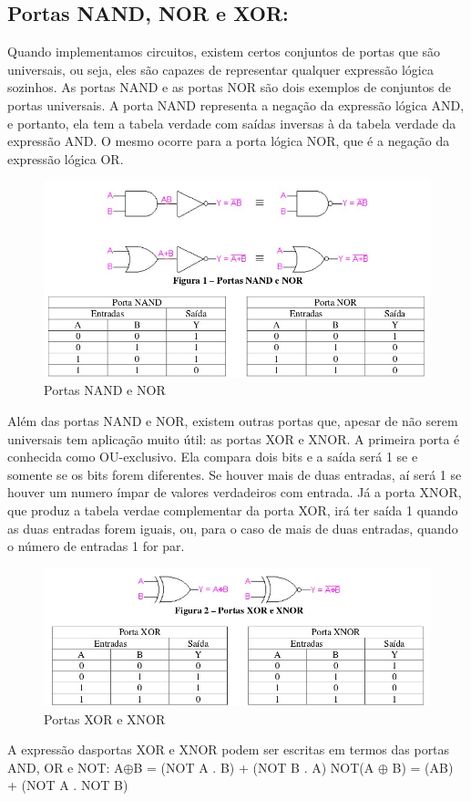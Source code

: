 \documentclass[12pt]{article}
\begin{document}
	
	\subsection{Portas NAND, NOR e XOR:}
	
	Quando implementamos circuitos, existem certos conjuntos de portas que são universais, ou seja, eles são capazes de representar qualquer expressão lógica sozinhos. As portas NAND e as portas NOR são dois exemplos de conjuntos de portas universais. A porta NAND representa a negação da expressão lógica AND, e portanto, ela tem a tabela verdade com saídas inversas à da tabela verdade da expressão AND. O mesmo ocorre para a porta lógica NOR, que é a negação da expressão lógica OR.
	
	\begin{figure}[H]
		\centering
		\includegraphics[width=.5\textwidth]{nandnor.jpg}
		\caption{Portas NAND e NOR}
		\label{fig:exemplo}
	\end{figure}
	
	
	Além das portas NAND e NOR, existem outras portas que, apesar de não serem universais tem aplicação muito útil: as portas XOR e XNOR. A primeira porta é conhecida como OU-exclusivo. Ela compara dois bits e a saída será 1 se e somente se os bits forem diferentes. Se houver mais de duas entradas, aí será 1 se houver um numero ímpar de valores verdadeiros com entrada. Já a porta XNOR, que produz a tabela verdae complementar da porta XOR, irá ter saída 1 quando as duas entradas forem iguais, ou, para o caso de mais de duas entradas, quando o número de entradas 1 for par. 
	
	\begin{figure}[H]
		\centering
		\includegraphics[width=.5\textwidth]{xorxnor.jpg}
		\caption{Portas XOR e XNOR}
		\label{fig:exemplo}
	\end{figure}
	
	A expressão dasportas XOR e XNOR podem ser escritas em termos das portas AND, OR e NOT:
	A$\oplus$B = (NOT A . B) + (NOT B . A)
	NOT(A $\oplus$ B) = (AB) + (NOT A . NOT B)
	
\end{document}
